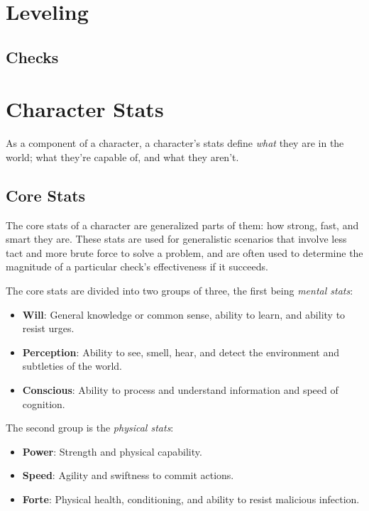 \documentclass[../main.tex]{subfiles}
\begin{document}
    \section{Leveling}

    \subsection{Checks}

    \section{Character Stats}

        As a component of a character, a character's stats define \emph{what} they are in the world; what they're capable of, and what they aren't.

    \subsection{Core Stats}

        The core stats of a character are generalized parts of them: how strong, fast, and smart they are. These stats are used for generalistic scenarios that involve less tact and more brute force to solve a problem, and are often used to determine the magnitude of a particular check's effectiveness if it succeeds.

        The core stats are divided into two groups of three, the first being \emph{mental stats}:

    \begin{itemize}
        \item \textbf{Will}: General knowledge or common sense, ability to learn, and ability to resist urges. 
        \item \textbf{Perception}: Ability to see, smell, hear, and detect the environment and subtleties of the world.
        \item \textbf{Conscious}: Ability to process and understand information and speed of cognition.
    \end{itemize}

        The second group is the {\em physical stats}:

    \begin{itemize}
        \item \textbf{Power}: Strength and physical capability.
        \item \textbf{Speed}: Agility and swiftness to commit actions.
        \item \textbf{Forte}: Physical health, conditioning, and ability to resist malicious infection.
    \end{itemize}
\end{document}
